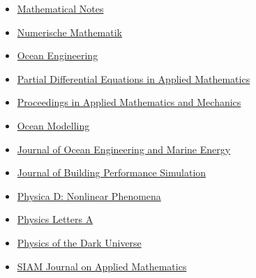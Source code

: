 \begin{itemize}
    \item[$\blacktriangleright$] \href{https://link.springer.com/journal/11006/}%
    {Mathematical Notes}
    
    \item[$\blacktriangleright$] \href{http://www.springerlink.com/content/100497/}%
    {Numerische Mathematik}
    
    \item[$\blacktriangleright$] \href{http://www.journals.elsevier.com/ocean-engineering/}%
    {Ocean Engineering}

    \item[$\blacktriangleright$] \href{https://www.sciencedirect.com/journal/partial-differential-equations-in-applied-mathematics/}%
    {Partial Differential Equations in Applied Mathematics}

    \item[$\blacktriangleright$] \href{https://onlinelibrary.wiley.com/journal/16177061/}%
    {Proceedings in Applied Mathematics and Mechanics}
    
    \item[$\blacktriangleright$] \href{http://www.elsevier.com/wps/find/journaldescription.cws_home/601376/description#description}%
    {Ocean Modelling}
    
    \item[$\blacktriangleright$] \href{http://www.springer.com/engineering/civil+engineering/journal/40722/}%
    {Journal of Ocean Engineering and Marine Energy}
    
    \item[$\blacktriangleright$] \href{https://www.tandfonline.com/toc/tbps20/current/}%
    {Journal of Building Performance Simulation}

    \item[$\blacktriangleright$] \href{https://www.sciencedirect.com/journal/physica-d-nonlinear-phenomena/}%
    {Physica D: Nonlinear Phenomena}
    
    \item[$\blacktriangleright$] \href{http://www.journals.elsevier.com/physics-letters-a/}%
    {Physics Letters A}
    
    \item[$\blacktriangleright$] \href{https://www.sciencedirect.com/journal/physics-of-the-dark-universe/}%
    {Physics of the Dark Universe}
    
    \item[$\blacktriangleright$] \href{http://www.siam.org/journals/siap.php}%
    {SIAM Journal on Applied Mathematics}


\end{itemize}
